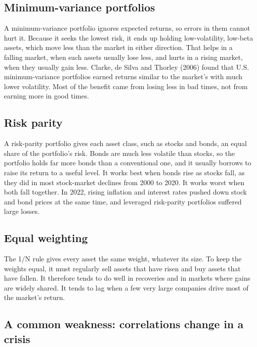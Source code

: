 \subsection{Minimum-variance portfolios}

A minimum-variance portfolio ignores expected returns, so errors in them cannot hurt it. Because it seeks the lowest risk, it ends up holding low-volatility, low-beta assets, which move less than the market in either direction. That helps in a falling market, when such assets usually lose less, and hurts in a rising market, when they usually gain less. Clarke, de Silva and Thorley (2006) found that U.S. minimum-variance portfolios earned returns similar to the market's with much lower volatility. Most of the benefit came from losing less in bad times, not from earning more in good times.

\subsection{Risk parity}

A risk-parity portfolio gives each asset class, such as stocks and bonds, an equal share of the portfolio's risk. Bonds are much less volatile than stocks, so the portfolio holds far more bonds than a conventional one, and it usually borrows to raise its return to a useful level. It works best when bonds rise as stocks fall, as they did in most stock-market declines from 2000 to 2020. It works worst when both fall together. In 2022, rising inflation and interest rates pushed down stock and bond prices at the same time, and leveraged risk-parity portfolios suffered large losses.

\subsection{Equal weighting}

The 1/N rule gives every asset the same weight, whatever its size. To keep the weights equal, it must regularly sell assets that have risen and buy assets that have fallen. It therefore tends to do well in recoveries and in markets where gains are widely shared. It tends to lag when a few very large companies drive most of the market's return.

\subsection{A common weakness: correlations change in a crisis}

